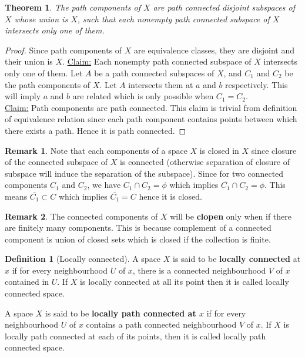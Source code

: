 \documentclass[12pt,reqno]{amsart}
\theoremstyle{plain}
\newtheorem{thm}{Theorem}
\theoremstyle{definition}
\newtheorem{defn}{Definition}
\newtheorem{rem}{Remark}
\begin{document}
\begin{thm}
    The path components of $X$ are path connected disjoint subspaces of $X$ whose union is $X$, such that each nonempty path connected subspace of $X$ intersects only one of them.    
\end{thm}
\begin{proof}
    Since path components of $X$ are equivalence classes, they are disjoint and their union is $X$. \underline{Claim:} Each nonempty path connected subspace of $X$ intersects only one of them. Let $A$ be a path connected subspaces of $X$, and $C_1$ and $C_2$ be the path components of $X$. Let $A$ intersects them at $a$ and $b$ respectively. This will imply $a$ and $b$ are related which is only possible when $C_1 = C_2$.\\
    \underline{Claim:} Path components are path connected. This claim is trivial from definition of equivalence relation since each path component contains points between which there exists a path. Hence it is path connected.
\end{proof}
\begin{rem}
    Note that each components of a space $X$ is closed in $X$ since closure of the connected subspace of $X$ is connected (otherwise separation of closure of subspace will induce the separation of the subspace). Since for two connected components $C_1$ and $C_2$, we have $C_1 \cap C_2 = \phi$ which implies $\overline{C_1} \cap C_2 = \phi$. This means $\overline{C_1} \subset C$ which implies $\overline{C_1} = C$ hence it is closed.
\end{rem}
\begin{rem}
    The connected components of $X$ will be {\bf clopen} only when if there are finitely many components. This is because complement of a connected component is union of closed sets which is closed if the collection is finite.
\end{rem}
\begin{defn}[Locally connected]
    A space $X$ is said to be {\bf locally connected} at $x$ if for every neighbourhood $U$ of $x$, there is a connected neighbourhood $V$ of $x$ contained in $U$. If $X$ is locally connected at all its point then it is called locally connected space.

    A space $X$ is said to be {\bf locally path connected at $x$} if for every neighbourhood $U$ of $x$ contains a path connected neighbourhood $V$ of $x$. If $X$ is locally path connected at each of its points, then it is called locally path connected space.
\end{defn}
\end{document}
